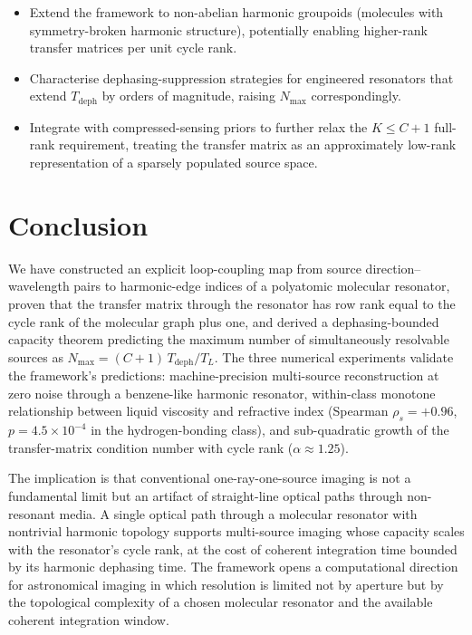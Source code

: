 \documentclass[11pt,twocolumn,a4paper]{article}
\theoremstyle{definition}
\theoremstyle{remark}
\begin{document}
\begin{itemize}[nosep]
\item Extend the framework to non-abelian harmonic groupoids (molecules with symmetry-broken harmonic structure), potentially enabling higher-rank transfer matrices per unit cycle rank.
\item Characterise dephasing-suppression strategies for engineered resonators that extend $T_{\mathrm{deph}}$ by orders of magnitude, raising $N_{\max}$ correspondingly.
\item Integrate with compressed-sensing priors \citep{candes2006} to further relax the $K \leq C + 1$ full-rank requirement, treating the transfer matrix as an approximately low-rank representation of a sparsely populated source space.
\end{itemize}

\section{Conclusion}
\label{sec:conclusion}

We have constructed an explicit loop-coupling map from source direction--wavelength pairs to harmonic-edge indices of a polyatomic molecular resonator, proven that the transfer matrix through the resonator has row rank equal to the cycle rank of the molecular graph plus one, and derived a dephasing-bounded capacity theorem predicting the maximum number of simultaneously resolvable sources as $N_{\max} = (C+1)\, T_{\mathrm{deph}}/T_L$. The three numerical experiments validate the framework's predictions: machine-precision multi-source reconstruction at zero noise through a benzene-like harmonic resonator, within-class monotone relationship between liquid viscosity and refractive index (Spearman $\rho_s = +0.96$, $p = 4.5\times 10^{-4}$ in the hydrogen-bonding class), and sub-quadratic growth of the transfer-matrix condition number with cycle rank ($\alpha \approx 1.25$).

The implication is that conventional one-ray-one-source imaging is not a fundamental limit but an artifact of straight-line optical paths through non-resonant media. A single optical path through a molecular resonator with nontrivial harmonic topology supports multi-source imaging whose capacity scales with the resonator's cycle rank, at the cost of coherent integration time bounded by its harmonic dephasing time. The framework opens a computational direction for astronomical imaging in which resolution is limited not by aperture but by the topological complexity of a chosen molecular resonator and the available coherent integration window.
\end{document}
